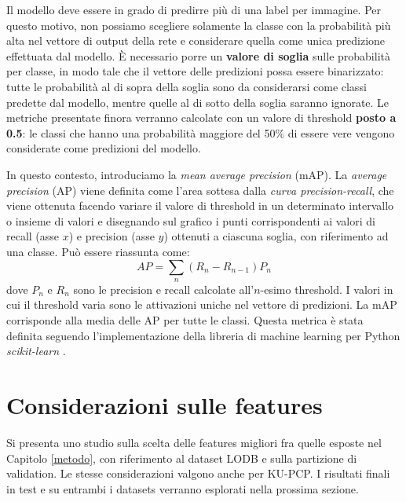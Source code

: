 Il modello deve essere in grado di predirre più di una label per immagine. Per questo motivo, non possiamo scegliere solamente la classe con la probabilità più alta nel vettore di output della rete e considerare quella come unica predizione effettuata dal modello. È necessario porre un \textbf{valore di soglia} sulle probabilità per classe, in modo tale che il vettore delle predizioni possa essere binarizzato: tutte le probabilità al di sopra della soglia sono da considerarsi come classi predette dal modello, mentre quelle al di sotto della soglia saranno ignorate. Le metriche presentate finora verranno calcolate con un valore di threshold \textbf{posto a 0.5}: le classi che hanno una probabilità maggiore del 50\% di essere vere vengono considerate come predizioni del modello.

In questo contesto, introduciamo la \textit{mean average precision} (mAP). La \textit{average precision} (AP) viene definita come l'area sottesa dalla \textit{curva precision-recall}, che viene ottenuta facendo variare il valore di threshold in un determinato intervallo o insieme di valori e disegnando sul grafico i punti corrispondenti ai valori di recall (asse \(x\)) e precision (asse \(y\)) ottenuti a ciascuna soglia, con riferimento ad una classe. Può essere riassunta come:
\begin{equation}
    AP = \sum_n(R_n-R_{n-1})P_n
\end{equation}
dove \(P_n\) e \(R_n\) sono le precision e recall calcolate all'\(n\)-esimo threshold. I valori in cui il threshold varia sono le attivazioni uniche nel vettore di predizioni. La mAP corrisponde alla media delle AP per tutte le classi. Questa metrica è stata definita seguendo l'implementazione della libreria di machine learning per Python \textit{scikit-learn} \cite{sklearn}.

\section{Considerazioni sulle features}
Si presenta uno studio sulla scelta delle features migliori fra quelle esposte nel Capitolo \ref{metodo}, con riferimento al dataset LODB e sulla partizione di validation. Le stesse considerazioni valgono anche per KU-PCP. I risultati finali in test e su entrambi i datasets verranno esplorati nella prossima sezione.

